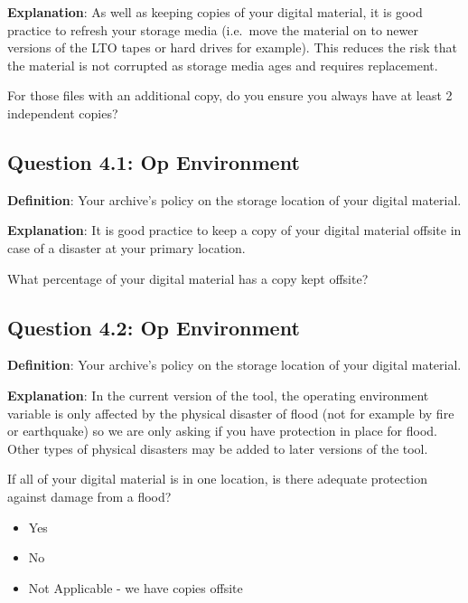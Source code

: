 \documentclass[a4paper,oneside]{article}
\providecommand{\tightlist}{%
    \setlength{\itemsep}{2pt}\setlength{\parskip}{0pt}}
\begin{document}
\begin{landscape}
\textbf{Explanation}: As well as keeping copies of your digital material, it is good practice to refresh your storage media (i.e.~move the material on to newer versions of the LTO tapes or hard drives for example). This reduces the risk that the material is not corrupted as storage media ages and requires replacement.

For those files with an additional copy, do you ensure you always have at least 2 independent copies?

\newpage

\hypertarget{question-4.1-op-environment}{%
\subsection{Question 4.1: Op Environment}\label{question-4.1-op-environment}}

\textbf{Definition}: Your archive's policy on the storage location of your digital material.

\textbf{Explanation}: It is good practice to keep a copy of your digital material offsite in case of a disaster at your primary location.

What percentage of your digital material has a copy kept offsite?

\newpage

\hypertarget{question-4.2-op-environment}{%
\subsection{Question 4.2: Op Environment}\label{question-4.2-op-environment}}

\textbf{Definition}: Your archive's policy on the storage location of your digital material.

\textbf{Explanation}: In the current version of the tool, the operating environment variable is only affected by the physical disaster of flood (not for example by fire or earthquake) so we are only asking if you have protection in place for flood. Other types of physical disasters may be added to later versions of the tool.

If all of your digital material is in one location, is there adequate protection against damage from a flood?

\begin{itemize}
\tightlist
\item
  Yes\\
\item
  No\\
\item
  Not Applicable - we have copies offsite
\end{itemize}


\end{landscape}
\end{document}
